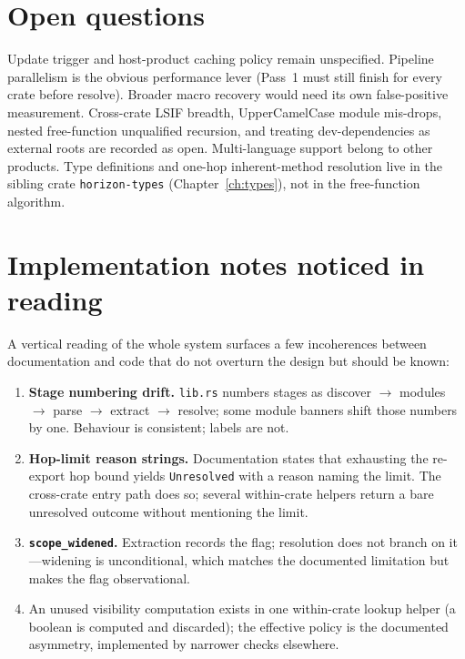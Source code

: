 \documentclass[11pt,a4paper,oneside]{report}
\begin{document}
\section{Open questions}

Update trigger and host-product caching policy remain unspecified. Pipeline
parallelism is the obvious performance lever (Pass~1 must still finish for
every crate before resolve). Broader macro recovery would need its own
false-positive measurement. Cross-crate LSIF breadth, UpperCamelCase module
mis-drops, nested free-function unqualified recursion, and treating
dev-dependencies as external roots are recorded as open. Multi-language
support belong to other products. Type definitions and one-hop inherent-method
resolution live in the sibling crate \texttt{horizon-types}
(Chapter~\ref{ch:types}), not in the free-function algorithm.

\section{Implementation notes noticed in reading}

A vertical reading of the whole system surfaces a few incoherences between
documentation and code that do not overturn the design but should be known:

\begin{enumerate}[nosep]
  \item \textbf{Stage numbering drift.} \texttt{lib.rs} numbers stages as
    discover $\to$ modules $\to$ parse $\to$ extract $\to$ resolve; some
    module banners shift those numbers by one. Behaviour is consistent;
    labels are not.
  \item \textbf{Hop-limit reason strings.} Documentation states that
    exhausting the re-export hop bound yields \texttt{Unresolved} with a
    reason naming the limit. The cross-crate entry path does so; several
    within-crate helpers return a bare unresolved outcome without mentioning
    the limit.
  \item \textbf{\texttt{scope\_widened}.} Extraction records the flag;
    resolution does not branch on it---widening is unconditional, which
    matches the documented limitation but makes the flag observational.
  \item An unused visibility computation exists in one within-crate lookup
    helper (a boolean is computed and discarded); the effective policy is the
    documented asymmetry, implemented by narrower checks elsewhere.
\end{enumerate}
\end{document}
